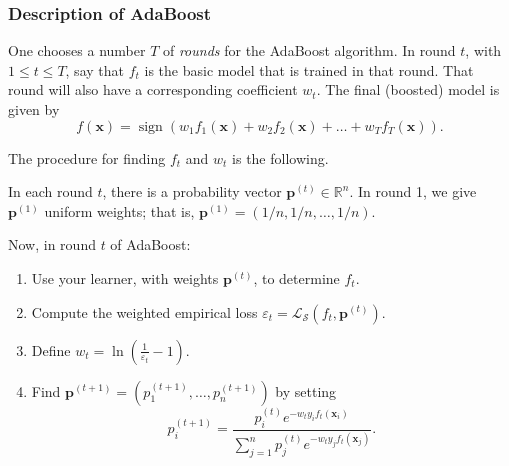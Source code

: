 \documentclass[smaller]{beamer}
\theoremstyle{example}
\newcommand{\x}{\textbf{x}}
\begin{document}
\begin{frame}
    \frametitle{Description of AdaBoost}
    One chooses a number $T$ of \textit{rounds} for the AdaBoost algorithm. In round $t$, with $1\le t\le T$, say that $f_t$ is the basic model that is trained in that round. That round will also have a corresponding coefficient $w_t$. The final (boosted) model is given by 
            \[f(\x) = \operatorname{sign}(w_1f_1(\x) + w_2f_2(\x) + \ldots + w_Tf_T(\x)).\]
    
    The procedure for finding $f_t$ and $w_t$ is the following. 

    In each round $t$, there is a probability vector $\textbf{p}^{(t)}\in\mathbb R^n$. In round 1, we give $\textbf{p}^{(1)}$ uniform weights; that is, $\textbf{p}^{(1)} = (1/n, 1/n, \ldots, 1/n)$. 

    Now, in round $t$ of AdaBoost:
    \begin{enumerate}
        \item Use your learner, with weights $\textbf{p}^{(t)}$, to determine $f_t$.
        \pause
        \item Compute the weighted empirical loss $\varepsilon_t = \mathcal L_{\mathcal S}(f_t, \textbf{p}^{(t)})$. 
        \item Define $w_t = \ln\left(\frac{1}{\varepsilon_t} - 1\right)$.
        \item Find $\textbf{p}^{(t+1)} = (p_1^{(t+1)}, \ldots, p_n^{(t+1)})$ by setting 
            \[p_i^{(t+1)} = \frac{p_i^{(t)}e^{-w_ty_if_t(\x_i)}}{\sum_{j=1}^n p_j^{(t)}e^{-w_ty_jf_t(\x_j)}}.\]
    \end{enumerate}

\end{frame}
\end{document}
